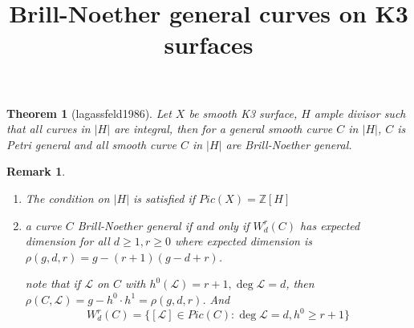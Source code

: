 \documentclass{article}
\title{Brill-Noether general curves on K3 surfaces}
\author{}
\newtheorem{theorem}[definition]{Theorem}
\newtheorem{remark}[definition]{Remark}
\begin{document}
\maketitle
\begin{theorem}[lagassfeld1986]
  Let $X$ be smooth K3 surface, $H$ ample divisor such that all curves in $|H|$ are integral, then for a general smooth curve $C$ in $|H|$, $C$ is Petri general and all smooth curve $C$ in $|H|$ are Brill-Noether general.     
\end{theorem}
\begin{remark}
  \begin{enumerate}
    \item The condition on $|H|$ is satisfied if $Pic(X)= \mathbb{Z}[H]$
    \item a curve $C$ Brill-Noether general   if and only if $W^{r}_{d}(C)$ has expected dimension for all $d\ge 1, r\ge 0$ where expected dimension is $\rho(g,d,r)=g-(r+1)(g-d+r)$.

      note that if $\mathcal{L}$ on  $C$ with $h^{0}(\mathcal{L})=r+1,\deg \mathcal{L}=d$, then $\rho(C,\mathcal{L})=g-h^{0}\cdot h^{1}=\rho(g,d,r)$. And
      \[
        W^{r}_{d}(C)= \{ [\mathcal{L}] \in Pic(C): \deg \mathcal{L}=d, h^{0}\ge r+1 \} 
      \]
      
  \end{enumerate}
\end{remark}
\end{document}
